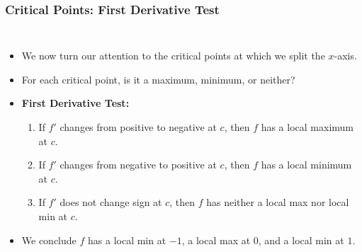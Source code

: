 \documentclass[serif,ignorenonframetext]{beamer}
\begin{document}
\begin{frame}
\begin{columns}
  \end{columns}
\end{frame}

\begin{frame}
  \frametitle{Critical Points: First Derivative Test}
  \begin{columns}
  \begin{itemize}[<+->]
  \item We now turn our attention to the critical points
    at which we split the $x$-axis.
  \item For each critical point, is it
    a maximum, minimum, or neither?
  \item \textbf{First Derivative Test:}
    \begin{enumerate}
    \item If $f'$ changes from positive to negative
      at $c$, then $f$ has a local maximum at $c$.
    \item If $f'$ changes from negative to positive
      at $c$, then $f$ has a local minimum at $c$.
    \item If $f'$ does not change sign at $c$, then
      $f$ has neither a local max nor local min at $c$.
    \end{enumerate}
  \item We conclude $f$ has a local min at $-1$, a local
    max at $0$, and a local min at $1$.
  \end{itemize}
  \end{columns}
\end{frame}
\end{document}
